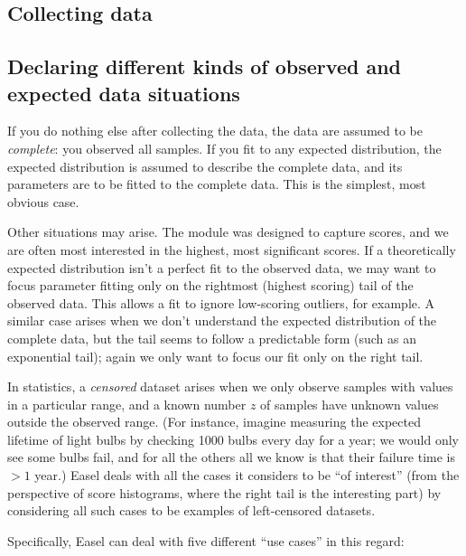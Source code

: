 \subsection{Collecting data}


\subsection{Declaring different kinds of observed and expected data situations}

If you do nothing else after collecting the data, the data are assumed
to be \emph{complete}: you observed all samples. If you fit to any
expected distribution, the expected distribution is assumed to
describe the complete data, and its parameters are to be fitted to the
complete data. This is the simplest, most obvious case.

Other situations may arise. The  module was
designed to capture scores, and we are often most interested in the
highest, most significant scores. If a theoretically expected
distribution isn't a perfect fit to the observed data, we may want to
focus parameter fitting only on the rightmost (highest scoring) tail
of the observed data. This allows a fit to ignore low-scoring
outliers, for example. A similar case arises when we don't understand
the expected distribution of the complete data, but the tail seems to
follow a predictable form (such as an exponential tail); again we only
want to focus our fit only on the right tail.

In statistics, a \emph{censored} dataset arises when we only observe
samples with values in a particular range, and a known number $z$ of
samples have unknown values outside the observed range. (For instance,
imagine measuring the expected lifetime of light bulbs by checking
1000 bulbs every day for a year; we would only see some bulbs fail,
and for all the others all we know is that their failure time is $>1$
year.) Easel deals with all the cases it considers to be ``of
interest'' (from the perspective of score histograms, where the right
tail is the interesting part) by considering all such cases to be
examples of left-censored datasets. 

Specifically, Easel can deal with five different ``use cases'' in this
regard:

